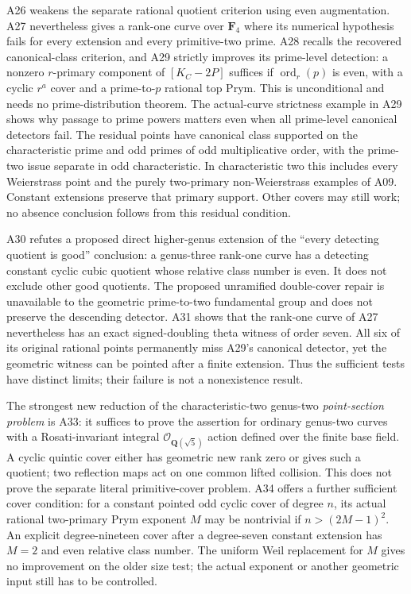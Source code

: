 \documentclass[11pt,a4paper]{article}
\begin{document}
A26 weakens the separate rational quotient criterion using even
augmentation. A27 nevertheless gives a rank-one curve over $\mathbf F_4$
where its numerical hypothesis fails for every extension and every
primitive-two prime. A28 recalls the recovered canonical-class criterion,
and A29 strictly improves its prime-level detection: a nonzero
$r$-primary component of $[K_C-2P]$ suffices if
$\operatorname{ord}_r(p)$ is even, with a cyclic $r^a$ cover and a
prime-to-$p$ rational top Prym. This is unconditional and needs no
prime-distribution theorem. The actual-curve strictness example in A29
shows why passage to prime powers matters even when all prime-level
canonical detectors fail. The residual points have canonical class
supported on the characteristic prime and odd primes of odd
multiplicative order, with the prime-two issue separate in odd
characteristic. In characteristic two this includes every Weierstrass
point and the purely two-primary non-Weierstrass examples of A09.
Constant extensions preserve that primary support. Other covers may
still work; no absence conclusion follows from this residual condition.

A30 refutes a proposed direct higher-genus extension of the
``every detecting quotient is good'' conclusion: a genus-three
rank-one curve has a detecting constant cyclic cubic quotient whose
relative class number is even. It does not exclude other good
quotients. The proposed unramified double-cover repair is unavailable
to the geometric prime-to-two fundamental group and does not preserve
the descending detector. A31 shows that the rank-one curve of A27
nevertheless has an exact signed-doubling theta witness of order seven.
All six of its original rational points permanently miss A29's
canonical detector, yet the geometric witness can be pointed after
a finite extension. Thus the sufficient tests have distinct limits;
their failure is not a nonexistence result.

The strongest new reduction of the characteristic-two genus-two
\emph{point-section problem} is A33: it suffices to prove the assertion
for ordinary genus-two curves with a Rosati-invariant integral
$\mathcal O_{\mathbf Q(\sqrt5)}$ action defined over the finite base field.
A cyclic quintic cover either has geometric new rank zero or gives such a
quotient; two reflection maps act on one common lifted collision.
This does not prove the separate literal primitive-cover problem.
A34 offers a further sufficient cover condition: for a constant pointed
odd cyclic cover of degree $n$, its actual rational two-primary Prym
exponent $M$ may be nontrivial if $n>(2M-1)^2$. An explicit degree-nineteen
cover after a degree-seven constant extension has $M=2$ and even relative
class number. The uniform Weil replacement for $M$ gives no improvement
on the older size test; the actual exponent or another geometric input
still has to be controlled.
\end{document}
